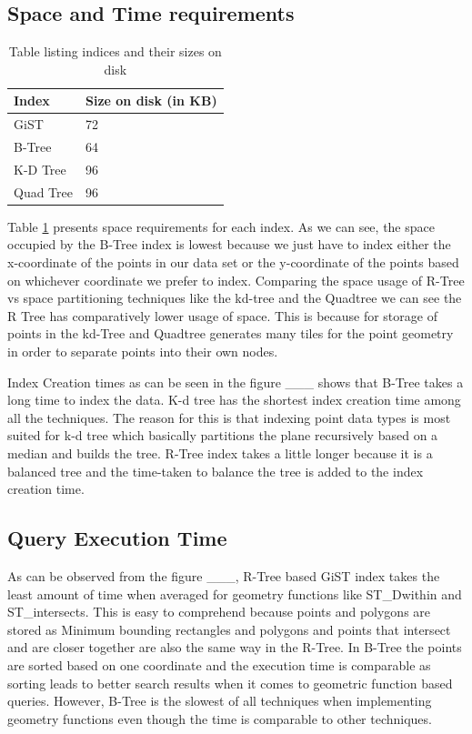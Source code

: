 \documentclass{sig-alternate-05-2015}
\begin{document}
\subsection{Space and Time requirements}
\begin{table}
\begin{tabular}{ |l|l| }
\hline
Index & Size on disk (in KB)\\
\hline
GiST & 72\\
\hline
B-Tree & 64\\
\hline
K-D Tree & 96\\
Quad Tree & 96\\
\hline
\end{tabular}
\caption{Table listing indices and their sizes on disk}
\label{tab:index}
\end{table}
Table \ref{tab:index} presents space requirements for each index. As we can see, the space occupied by the B-Tree index is lowest because we just have to index either the x-coordinate of the points in our data set or the y-coordinate of the points based on whichever coordinate we prefer to index. Comparing the space usage of R-Tree vs space partitioning techniques like the kd-tree and the Quadtree we can see the R Tree has comparatively lower usage of space. This is because for storage of points in the kd-Tree and Quadtree generates many tiles for the point geometry in order to separate points into their own nodes.

Index Creation times as can be seen in the figure ___ shows that B-Tree takes a long time to index the data. K-d tree has the shortest index creation time among all the techniques. The reason for this is that indexing point data types is most suited for k-d tree which basically partitions the plane recursively based on a median and builds the tree. R-Tree index takes a little longer because it is a balanced tree and the time-taken to balance the tree is added to the index creation time. 
\subsection{Query Execution Time}
As can be observed from the figure ___, R-Tree based GiST index takes the least amount of time when averaged for geometry functions like ST_Dwithin and ST_intersects. This is easy to comprehend because points and polygons are stored as Minimum bounding rectangles and polygons and points that intersect and are closer together are also the same way in the R-Tree. In B-Tree the points are sorted based on one coordinate and the execution time is comparable as sorting leads to better search results when it comes to geometric function based queries.  However, B-Tree is the slowest of all techniques when implementing geometry functions even though the time is comparable to other techniques.\\\\
\end{document}
